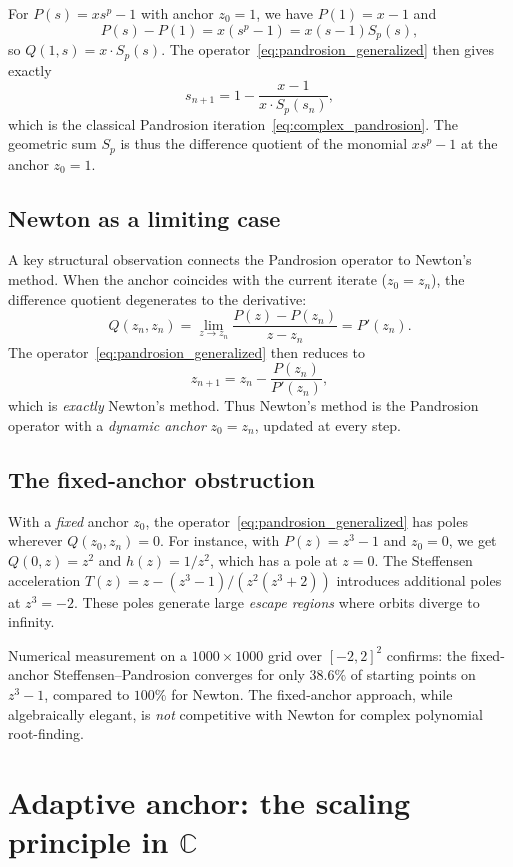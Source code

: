 \documentclass[11pt,a4paper]{article}
\theoremstyle{definition}
\newcommand{\CC}{\mathbb{C}}
\begin{document}
For $P(s) = x s^p - 1$ with anchor $z_0 = 1$, we have $P(1) = x - 1$ and
\[
  P(s) - P(1) = x(s^p - 1) = x(s-1) S_p(s),
\]
so $Q(1, s) = x \cdot S_p(s)$.  The operator~\eqref{eq:pandrosion_generalized} then gives exactly
\[
  s_{n+1} = 1 - \frac{x-1}{x \cdot S_p(s_n)},
\]
which is the classical Pandrosion iteration~\eqref{eq:complex_pandrosion}.  The geometric sum $S_p$ is thus the difference quotient of the monomial $x s^p - 1$ at the anchor $z_0 = 1$.

\subsection{Newton as a limiting case}

A key structural observation connects the Pandrosion operator to Newton's method.  When the anchor coincides with the current iterate ($z_0 = z_n$), the difference quotient degenerates to the derivative:
\[
  Q(z_n, z_n) = \lim_{z \to z_n} \frac{P(z) - P(z_n)}{z - z_n} = P'(z_n).
\]
The operator~\eqref{eq:pandrosion_generalized} then reduces to
\[
  z_{n+1} = z_n - \frac{P(z_n)}{P'(z_n)},
\]
which is \emph{exactly} Newton's method.  Thus Newton's method is the Pandrosion operator with a \emph{dynamic anchor} $z_0 = z_n$, updated at every step.

\subsection{The fixed-anchor obstruction}

With a \emph{fixed} anchor $z_0$, the operator~\eqref{eq:pandrosion_generalized} has poles wherever $Q(z_0, z_n) = 0$.  For instance, with $P(z) = z^3 - 1$ and $z_0 = 0$, we get $Q(0,z) = z^2$ and $h(z) = 1/z^2$, which has a pole at $z = 0$.  The Steffensen acceleration $T(z) = z - (z^3-1)/(z^2(z^3+2))$ introduces additional poles at $z^3 = -2$.  These poles generate large \emph{escape regions} where orbits diverge to infinity.

Numerical measurement on a $1000 \times 1000$ grid over $[-2,2]^2$ confirms: the fixed-anchor Steffensen--Pandrosion converges for only $38.6\%$ of starting points on $z^3 - 1$, compared to $100\%$ for Newton.  The fixed-anchor approach, while algebraically elegant, is \emph{not} competitive with Newton for complex polynomial root-finding.

\section{Adaptive anchor: the scaling principle in $\CC$}
\label{sec:adaptive}
\end{document}
